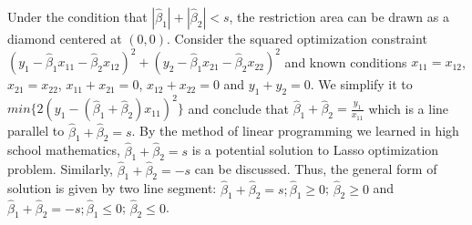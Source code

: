 \documentclass[10pt]{article}
\begin{document}
Under the condition that $| \hat{\beta}_1 | + | \hat{\beta}_2 | < s$, the restriction area can be drawn as a diamond centered at $(0, 0)$. Consider the squared optimization constraint $(y_1 - \hat{\beta}_1x_{11} - \hat{\beta}_2x_{12})^2 + (y_2 - \hat{\beta}_1x_{21} - \hat{\beta}_2x_{22})^2$ and known conditions $x_{11} = x_{12}$, $x_{21} = x_{22}$, $x_{11} + x_{21}=0$, $x_{12} + x_{22}=0$ and $y_1 + y_2 = 0$. We simplify it to $min\{2(y_1 - (\hat{\beta}_1 + \hat{\beta}_2)x_{11})^2\}$ and conclude that $\hat{\beta}_1 + \hat{\beta}_2 = \frac{y_1}{x_{11}}$ which is a line parallel to $\hat{\beta}_1 + \hat{\beta}_2 = s$. By the method of linear programming we learned in high school mathematics, $\hat{\beta}_1 + \hat{\beta}_2 = s$ is a potential solution to Lasso optimization problem. Similarly, $\hat{\beta}_1 + \hat{\beta}_2 = -s$ can be discussed. Thus, the general form of solution is given by two line segment: $\hat{\beta}_1 + \hat{\beta}_2 = s; \hat{\beta}_1 \geq 0$; $\hat{\beta}_2 \geq 0$ and $\hat{\beta}_1 + \hat{\beta}_2 = -s; \hat{\beta}_1 \leq 0$; $\hat{\beta}_2 \leq 0$.
\end{document}
